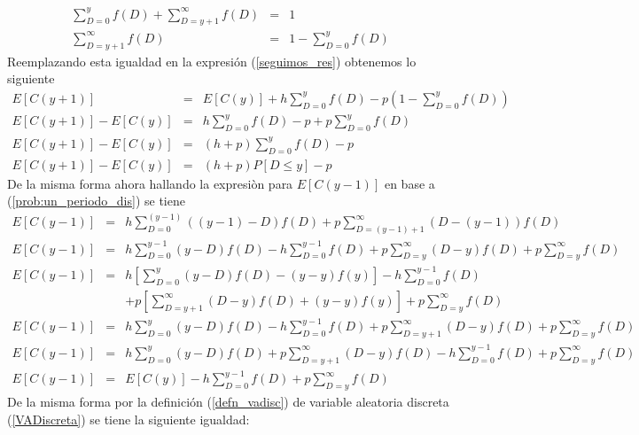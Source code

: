 \begin{eqnarray}
	\sum\limits_{D = 0}^{y}f(D) + \sum\limits_{D = y+1}^{\infty} f(D) &=& 1 \nonumber \\
	\sum\limits_{D = y+1}^{\infty} f(D) &=& 1 - \sum\limits_{D = 0}^{y}f(D) \nonumber
\end{eqnarray}
Reemplazando esta igualdad en la expresión (\ref{seguimos_res}) obtenemos lo siguiente
\begin{eqnarray}
	\label{prob:Prim_cond_optima}
	E[C(y+1)] &=& E[C(y)] + h \sum\limits_{D = 0}^{y} f(D) - p \left(1 - \sum\limits_{D = 0}^{y}f(D) \right) \nonumber \\
	E[C(y+1)] - E[C(y)] &=& h \sum\limits_{D = 0}^{y} f(D) - p + p \sum\limits_{D = 0}^{y}f(D) \nonumber \\
	E[C(y+1)] - E[C(y)] &=& (h+p) \sum\limits_{D = 0}^{y}f(D)  - p \nonumber \\
	E[C(y+1)] - E[C(y)] &=& (h+p) P[D \leq y] - p
\end{eqnarray}
De la misma forma ahora hallando la expresiòn para $E[C(y-1)]$ en base a (\ref{prob:un_periodo_dis}) se tiene
\begin{eqnarray}
	E[C(y-1)] &=& h \sum\limits_{D = 0}^{(y-1)}((y-1)-D)f(D) + p \sum\limits_{D = (y-1)+1}^{\infty} (D-(y-1))f(D) \nonumber \\
	E[C(y-1)] &=& h \sum\limits_{D = 0}^{y-1}(y-D)f(D) - h \sum\limits_{D = 0}^{y-1}f(D) + p \sum\limits_{D = y}^{\infty} (D-y)f(D) + p \sum\limits_{D = y}^{\infty} f(D) \nonumber \\
	E[C(y-1)] &=& h \left[ \sum\limits_{D = 0}^{y}(y-D)f(D) - (y-y)f(y) \right] - h \sum\limits_{D = 0}^{y-1}f(D) \nonumber \\
	 & & + p \left[ \sum\limits_{D = y+1}^{\infty}(D-y)f(D) + (y-y)f(y) \right] + p \sum\limits_{D = y}^{\infty} f(D) \nonumber \\
	E[C(y-1)] &=& h \sum\limits_{D = 0}^{y}(y-D)f(D) - h \sum\limits_{D = 0}^{y-1}f(D) + p \sum\limits_{D = y+1}^{\infty} (D-y)f(D) + p \sum\limits_{D = y}^{\infty} f(D) \nonumber
\end{eqnarray}
\begin{eqnarray}
	\label{seguimos_res2}
	E[C(y-1)] &=& h \sum\limits_{D = 0}^{y}(y-D)f(D) + p \sum\limits_{D = y+1}^{\infty} (D-y)f(D) - h \sum\limits_{D = 0}^{y-1}f(D) + p \sum\limits_{D = y}^{\infty} f(D) \nonumber \\
	E[C(y-1)] &=& E[C(y)] - h \sum\limits_{D = 0}^{y-1}f(D) + p \sum\limits_{D = y}^{\infty} f(D)
\end{eqnarray}	
De la misma forma por la definición (\ref{defn_vadisc}) de variable aleatoria discreta (\ref{VADiscreta}) se tiene la siguiente igualdad:
